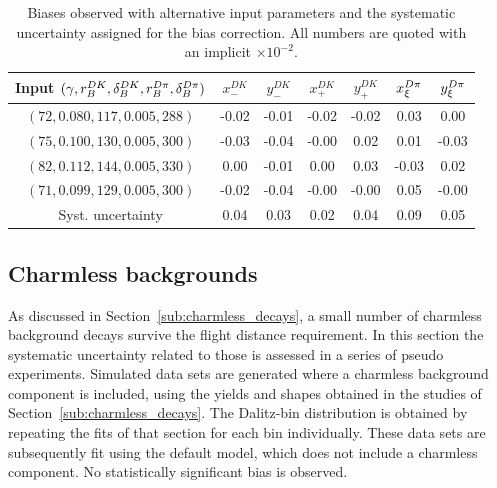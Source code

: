 
\begin{table}
  \centering
  \caption{Biases observed with alternative input parameters and the systematic uncertainty assigned for the bias correction.
  All numbers are quoted with an implicit $\times 10^{-2}$.
  \label{tab:bias_syst}
  }  



\begin{tabular}{c|cccccc}
\toprule
Input $(\gamma, r_B^{DK}, \delta_B^{DK}, r_B^{{D}\pi}, \delta_B^{{D}\pi})$ 
& $x_-^{DK} $& $y_-^{DK} $& $x_+^{DK} $& $y_+^{DK} $& $x_\xi^{{D}\pi} $& $y_\xi^{{D}\pi}$ \\
\midrule
$(72, 0.080, 117, 0.005, 288)$ & -0.02& -0.01& -0.02& -0.02& 0.03& 0.00 \\
$(75, 0.100, 130, 0.005, 300)$ & -0.03& -0.04& -0.00& 0.02& 0.01& -0.03 \\
$(82, 0.112, 144, 0.005, 330)$ & 0.00& -0.01& 0.00& 0.03& -0.03& 0.02 \\
$(71, 0.099, 129, 0.005, 300)$ & -0.02& -0.04& -0.00& -0.00& 0.05& -0.00 \\
\midrule
Syst. uncertainty & 0.04& 0.03& 0.02& 0.04& 0.09& 0.05 \\
\bottomrule
\end{tabular}

\end{table}




\subsection{Charmless backgrounds} %
\label{sub:systematics_from_charmless_backgrounds}

As discussed in Section~\ref{sub:charmless_decays}, a small number of charmless background decays survive the \D flight distance requirement. In this section the systematic uncertainty related to those is assessed in a series of pseudo experiments. Simulated data sets are generated where a charmless background component is included, using the yields and shapes obtained in the studies of Section~\ref{sub:charmless_decays}. The Dalitz-bin distribution is obtained by repeating the fits of that section for each bin individually. These data sets are subsequently fit using the default model, which does not include a charmless component. No statistically significant bias is observed.

